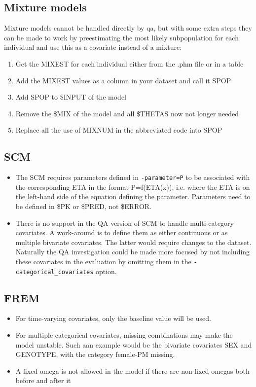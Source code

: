 \subsection{Mixture models}
Mixture models cannot be handled directly by qa, but with some extra steps they can be made to work by preestimating the most likely subpopulation for each individual and use this as a covariate instead of a mixture:
\begin{enumerate}
    \item Get the MIXEST for each individual either from the .phm file or in a table
    \item Add the MIXEST values as a column in your dataset and call it SPOP
    \item Add SPOP to \$INPUT of the model
    \item Remove the \$MIX of the model and all \$THETAS now not longer needed
    \item Replace all the use of MIXNUM in the abbreviated code into SPOP
\end{enumerate}


\subsection{SCM}
\begin{itemize}
	\item The SCM requires parameters defined in \verb|-parameter=P| to be associated with the corresponding ETA in the format P=f(ETA(x)), i.e. where the ETA is on the left-hand side of the equation defining the parameter. Parameters need to be defined in \$PK or \$PRED, not \$ERROR.

	\item There is no support in the QA version of SCM to handle multi-category covariates. A work-around is to define them as either continuous or as multiple bivariate covariates. The latter would require changes to the dataset. Naturally the QA investigation could be made more focused by not including these covariates in the evaluation by omitting them in the \verb|-categorical_covariates| option.
\end{itemize}

\subsection{FREM}
\begin{itemize}
	\item For time-varying covariates, only the baseline value will be used.
	\item For multiple categorical covariates, missing combinations may make the model unstable. Such aan example would be the bivariate covariates SEX and GENOTYPE, with the category female-PM missing.
	\item A fixed omega is not allowed in the model if there are non-fixed omegas both before and after it
\end{itemize}

